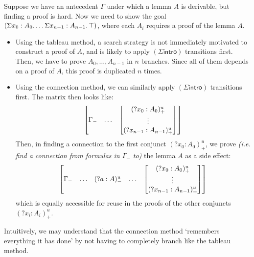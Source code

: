 \documentclass[twoside]{report}
\begin{document}
\begin{example}
Suppose we have an antecedent $\Gamma$ under which a lemma $A$ is derivable, but finding a proof is hard. Now we need to show the goal $(\Sigma{x_0} : {A_0}.\,{\ldots \Sigma{x_{n-1}} : {A_{n-1}}.\,{\top}})$, where each $A_i$ requires a proof of the lemma $A$.

\begin{itemize}
    \item Using the tableau method, a search strategy is not immediately motivated to construct a proof of $A$, and is likely to apply $(\Sigma\mathsf{intro})$ transitions first. Then, we have to prove $A_0, \ldots, A_{n-1}$ in $n$ branches. Since all of them depends on a proof of $A$, this proof is duplicated $n$ times.

    \item Using the connection method, we can similarly apply $(\Sigma\mathsf{intro})$ transitions first. The matrix then looks like:
    $$
    \begin{bmatrix}\Gamma_- & \ldots & \begin{bmatrix}({?x_0} : A_0)^u_+ \\ \vdots \\ ({?x_{n-1}} : A_{n-1})^u_+\end{bmatrix}\end{bmatrix}
    $$
    Then, in finding a connection to the first conjunct $({?x_0} : A_0)^u_+$, we prove \emph{(i.e. find a connection from formulas in $\Gamma_-$ to)} the lemma $A$ as a side effect:
    $$
    \begin{bmatrix}\Gamma_- & \ldots & ({?a} : A)^u_- & \ldots & \begin{bmatrix}({?x_0} : A_0)^u_+ \\ \vdots \\ ({?x_{n-1}} : A_{n-1})^u_+\end{bmatrix}\end{bmatrix}
    $$
    which is equally accessible for reuse in the proofs of the other conjuncts $({?x_i} : A_i)^u_+$.
\end{itemize}

Intuitively, we may understand that the connection method `remembers everything it has done' by not having to completely branch like the tableau method.
\end{example}
\end{document}

